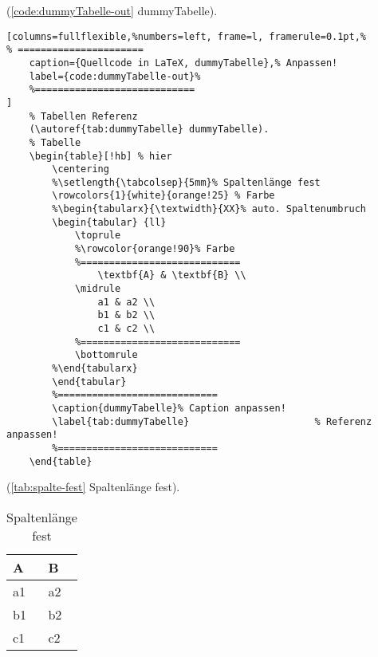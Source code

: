 (\autoref{code:dummyTabelle-out} dummyTabelle).
\lstset{language=[LaTeX]TeX} %
\begin{lstlisting}[columns=fullflexible,%numbers=left, frame=l, framerule=0.1pt,%
% ======================
	caption={Quellcode in LaTeX, dummyTabelle},% Anpassen!
	label={code:dummyTabelle-out}%
	%============================
]
	% Tabellen Referenz
	(\autoref{tab:dummyTabelle} dummyTabelle).
	% Tabelle
	\begin{table}[!hb] % hier
		\centering
		%\setlength{\tabcolsep}{5mm}% Spaltenlänge fest
		\rowcolors{1}{white}{orange!25} % Farbe
		%\begin{tabularx}{\textwidth}{XX}% auto. Spaltenumbruch
		\begin{tabular} {ll}
			\toprule 
			%\rowcolor{orange!90}% Farbe
			%============================
				\textbf{A} & \textbf{B} \\
			\midrule
				a1 & a2 \\
				b1 & b2 \\
				c1 & c2 \\
			%============================
			\bottomrule
		%\end{tabularx}
		\end{tabular}
		%============================
		\caption{dummyTabelle}% Caption anpassen!
		\label{tab:dummyTabelle}					  % Referenz anpassen!
		%============================
	\end{table}
\end{lstlisting}

(\autoref{tab:spalte-fest} Spaltenlänge fest).
\begin{table}[!hb] %
	\centering
	\setlength{\tabcolsep}{5mm}%
	\begin{tabular} {ll}
		\toprule 
	    \textbf{A} & \textbf{B} \\
	  \midrule
			a1 & a2 \\
			b1 & b2 \\
			c1 & c2 \\
		\bottomrule
	\end{tabular}
	\caption{Spaltenlänge fest}%
	\label{tab:spalte-fest}					  %
\end{table}

